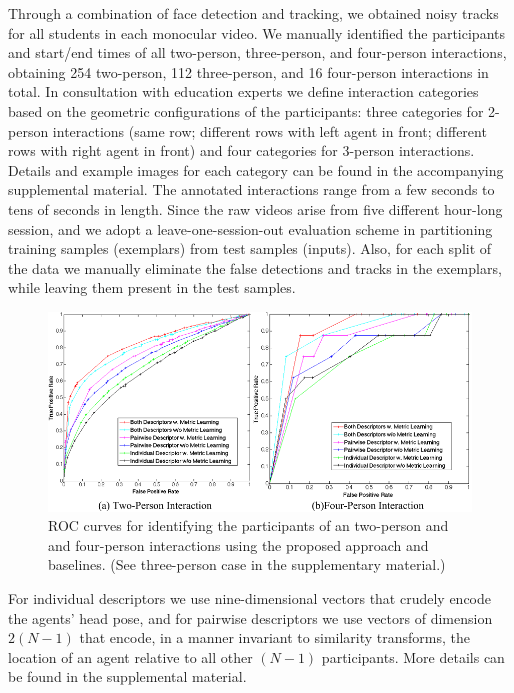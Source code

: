 Through a combination of face detection and tracking, we obtained noisy tracks for all students in each monocular video. We manually identified the participants and start/end times of all two-person, three-person, and four-person interactions, obtaining 254 two-person, 112 three-person, and 16 four-person interactions in total. In consultation with education experts we define interaction categories based on the geometric configurations of the participants: three categories for 2-person interactions (same row; different rows with left agent in front; different rows with right agent in front) and four categories for 3-person interactions. Details and example images for each category can be found in the accompanying supplemental material. The annotated interactions range from a few seconds to tens of seconds in length. Since the raw videos arise from five different hour-long session, and we adopt a leave-one-session-out evaluation scheme in partitioning  training samples (exemplars) from test samples (inputs). Also, for each split of the data we manually eliminate the false detections and tracks in the exemplars, while leaving them present in the test samples. 

\begin{figure}[t]
\vspace{-5pt}
\begin{center}
\includegraphics[width=\columnwidth]{ROC_p.png}
\end{center}
\caption{ROC curves for identifying the participants of an two-person and and four-person interactions using the proposed approach and baselines. (See three-person case in the supplementary material.)}
\label{ROC}
\vspace{-5pt}
\end{figure}



For individual descriptors we use nine-dimensional vectors that crudely encode the agents' head pose, and for pairwise descriptors we use vectors of dimension $2(N-1)$ that encode, in a manner invariant to similarity transforms, the location of an agent relative to all other $(N-1)$ participants. More details can be found in the supplemental material.


